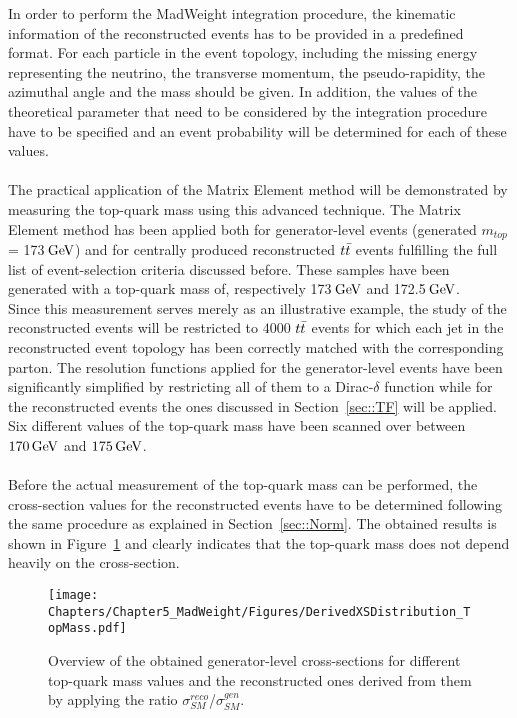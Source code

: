 In order to perform the MadWeight integration procedure, the kinematic information of the reconstructed events has to be provided in a predefined format. For each particle in the event topology, including the missing energy representing the neutrino, the transverse momentum, the pseudo-rapidity, the azimuthal angle and the mass should be given.
In addition, the values of the theoretical parameter that need to be considered by the integration procedure have to be specified and an event probability will be determined for each of these values.
\\
\\
The practical application of the Matrix Element method will be demonstrated by measuring the top-quark mass using this advanced technique.
The Matrix Element method has been applied both for generator-level events (generated $m_{top}$ = 173$\, \mathrm{GeV}$) and for centrally produced reconstructed $t\bar{t}$ events fulfilling the full list of event-selection criteria discussed before. These samples have been generated with a top-quark mass of, respectively 173$\, \mathrm{GeV}$ and 172.5$\, \mathrm{GeV}$.
\\
Since this measurement serves merely as an illustrative example, the study of the reconstructed events will be restricted to $4 000$ $t\bar{t}$ events for which each jet in the reconstructed event topology has been correctly matched with the corresponding parton. 
The resolution functions applied for the generator-level events have been significantly simplified by restricting all of them to a Dirac-$\delta$ function while for the reconstructed events the ones discussed in Section~\ref{sec::TF} will be applied.
Six different values of the top-quark mass have been scanned over between $170 \, \mathrm{GeV}$ and $175\, \mathrm{GeV}$. 
\\
\\
Before the actual measurement of the top-quark mass can be performed, the cross-section values for the reconstructed events have to be determined following the same procedure as explained in Section~\ref{sec::Norm}. The obtained results is shown in Figure~\ref{fig::XSDistrTop} and clearly indicates that the top-quark mass does not depend heavily on the cross-section.
\\
\begin{figure}[h!t]
 \centering
 \texttt{[image: Chapters/Chapter5\_MadWeight/Figures/DerivedXSDistribution\_TopMass.pdf]}
 \caption{Overview of the obtained generator-level cross-sections for different top-quark mass values and the reconstructed ones derived from them by applying the ratio $\sigma_{SM}^{reco}$/$\sigma_{SM}^{gen}$.} \label{fig::XSDistrTop}
\end{figure}

